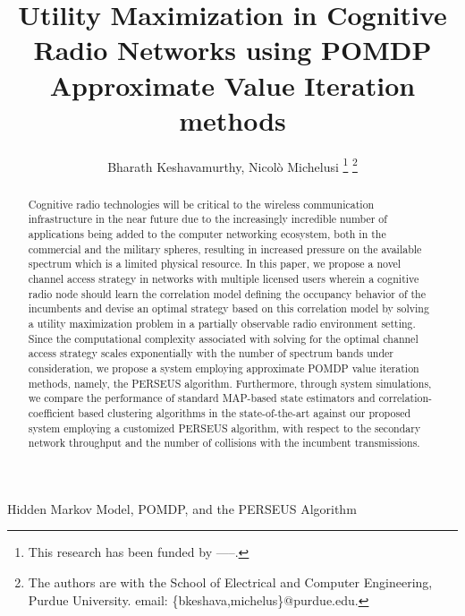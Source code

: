 \documentclass[10pt,twocolumn]{IEEEtran}
\title{Utility Maximization in Cognitive Radio Networks using POMDP Approximate Value Iteration methods}
\author{Bharath Keshavamurthy, Nicol\`{o} Michelusi
\thanks{This research has been funded by -----.}
\thanks{The authors are with the School of Electrical and Computer Engineering, Purdue University. email: \{bkeshava,michelus\}@purdue.edu.}
}
\begin{document}
 
\maketitle
{}
\begin{abstract}
Cognitive radio technologies will be critical to the wireless communication infrastructure in the near future due to the increasingly incredible number of applications being added to the computer networking ecosystem, both in the commercial and the military spheres, resulting in increased pressure on the available spectrum which is a limited physical resource. In this paper, we propose a novel channel access strategy in networks with multiple licensed users wherein a cognitive radio node should learn the correlation model defining the occupancy behavior of the incumbents and devise an optimal strategy based on this correlation model by solving a utility maximization problem in a partially observable radio environment setting. Since the computational complexity associated with solving for the optimal channel access strategy scales exponentially with the number of spectrum bands under consideration, we propose a system employing approximate POMDP value iteration methods, namely, the PERSEUS algorithm. Furthermore, through system simulations, we compare the performance of standard MAP-based state estimators and correlation-coefficient based clustering algorithms in the state-of-the-art against our proposed system employing a customized PERSEUS algorithm, with respect to the secondary network throughput and the number of collisions with the incumbent transmissions.
\end{abstract}
\begin{IEEEkeywords}
Hidden Markov Model, POMDP, and the PERSEUS Algorithm
\end{IEEEkeywords}
\end{document}
